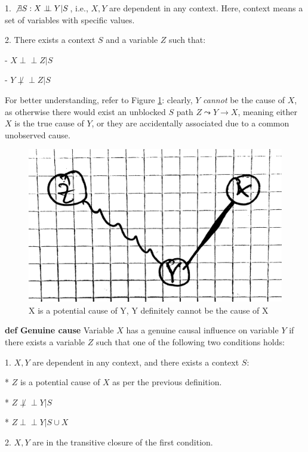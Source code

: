 \documentclass[fleqn]{article}
\newcommand{\independent}{\perp \!\!\! \perp}
\def\define#1{\textbf{def} \textbf{#1}}
\numberwithin{equation}{section}
\numberwithin{theorem}{section}
\numberwithin{figure}{section}
\numberwithin{lemma}{section}
\numberwithin{corollary}{section}
\begin{document}
1. $\not \exists S: X \independent Y | S$, i.e., $X,Y$ are dependent in any context. Here, context means a set of variables with specific values.

2. There exists a context $S$ and a variable $Z$ such that:

- $X \independent Z | S$

- $Y \not \independent Z | S$

For better understanding, refer to Figure \ref{fig:x_potential_cause_of_y}: clearly, $Y$ \textit{cannot} be the cause of $X$, as otherwise there would exist an unblocked $S$ path $Z \leadsto Y \rightarrow X$, meaning either $X$ is the true cause of $Y$, or they are accidentally associated due to a common unobserved cause.

\begin{figure}[h]
	\begin{center}
		\includegraphics[scale=0.07]{imgs/img17.png}
	\end{center}
	\caption{X is a potential cause of Y, Y definitely cannot be the cause of X}
	\label{fig:x_potential_cause_of_y}
\end{figure}

\define{Genuine cause} Variable $X$ has a genuine causal influence on variable $Y$ if there exists a variable $Z$ such that one of the following two conditions holds:

1. $X, Y$ are dependent in any context, and there exists a context $S$:

* $Z$ is a potential cause of $X$ as per the previous definition.

* $Z \not \independent Y | S$

* $Z \independent Y | S \cup X$

2. $X, Y$ are in the transitive closure of the first condition.
\end{document}
